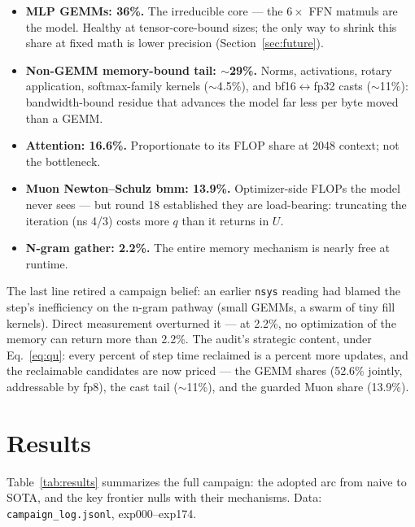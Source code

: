 \documentclass{article}
\begin{document}
\begin{itemize}
    \item \textbf{MLP GEMMs: 36\%.} The irreducible core --- the $6\times$ FFN matmuls are the model. Healthy at tensor-core-bound sizes; the only way to shrink this share at fixed math is lower precision (Section~\ref{sec:future}).
    \item \textbf{Non-GEMM memory-bound tail: $\sim$29\%.} Norms, activations, rotary application, softmax-family kernels ($\sim$4.5\%), and bf16$\leftrightarrow$fp32 casts ($\sim$11\%): bandwidth-bound residue that advances the model far less per byte moved than a GEMM.
    \item \textbf{Attention: 16.6\%.} Proportionate to its FLOP share at 2048 context; not the bottleneck.
    \item \textbf{Muon Newton--Schulz bmm: 13.9\%.} Optimizer-side FLOPs the model never sees --- but round 18 established they are load-bearing: truncating the iteration (ns 4/3) costs more $q$ than it returns in $U$.
    \item \textbf{N-gram gather: 2.2\%.} The entire memory mechanism is nearly free at runtime.
\end{itemize}

The last line retired a campaign belief: an earlier \texttt{nsys} reading had blamed the step's inefficiency on the n-gram pathway (small GEMMs, a swarm of tiny fill kernels). Direct measurement overturned it --- at 2.2\%, no optimization of the memory can return more than 2.2\%. The audit's strategic content, under Eq.~\ref{eq:qu}: every percent of step time reclaimed is a percent more updates, and the reclaimable candidates are now priced --- the GEMM shares (52.6\% jointly, addressable by fp8), the cast tail ($\sim$11\%), and the guarded Muon share (13.9\%).

\section{Results}
\label{sec:results}

Table~\ref{tab:results} summarizes the full campaign: the adopted arc from naive to SOTA, and the key frontier nulls with their mechanisms. Data: \texttt{campaign\_log.jsonl}, exp000--exp174.
\end{document}
